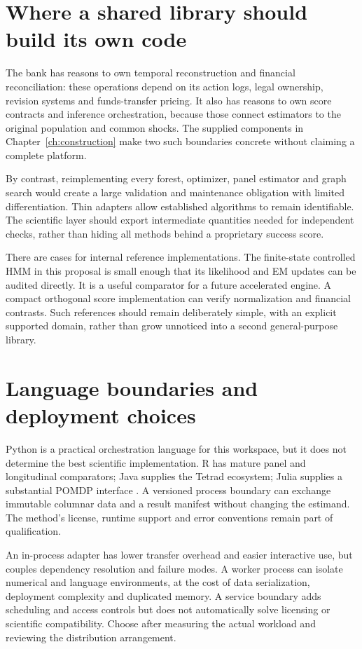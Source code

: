 \section{Where a shared library should build its own code}
The bank has reasons to own temporal reconstruction and financial
reconciliation: these operations depend on its action logs, legal ownership,
revision systems and funds-transfer pricing. It also has reasons to own
score contracts and inference orchestration, because those connect
estimators to the original population and common shocks. The supplied
components in Chapter~\ref{ch:construction} make two such boundaries
concrete without claiming a complete platform.

By contrast, reimplementing every forest, optimizer, panel estimator and
graph search would create a large validation and maintenance obligation
with limited differentiation. Thin adapters allow established algorithms
to remain identifiable. The scientific layer should export intermediate
quantities needed for independent checks, rather than hiding all methods
behind a proprietary success score.

There are cases for internal reference implementations. The finite-state
controlled HMM in this proposal is small enough that its likelihood and EM
updates can be audited directly. It is a useful comparator for a future
accelerated engine. A compact orthogonal score implementation can verify
normalization and financial contrasts. Such references should remain
deliberately simple, with an explicit supported domain, rather than grow
unnoticed into a second general-purpose library.

\section{Language boundaries and deployment choices}
Python is a practical orchestration language for this workspace, but it
does not determine the best scientific implementation. R has mature
panel and longitudinal comparators; Java supplies the Tetrad ecosystem;
Julia supplies a substantial POMDP interface \citep{sw_did,sw_ltmle,
sw_tetrad,sw_pomdps}. A versioned process boundary can exchange immutable
columnar data and a result manifest without changing the estimand.
The method's license, runtime support and error conventions remain part
of qualification.

An in-process adapter has lower transfer overhead and easier interactive
use, but couples dependency resolution and failure modes. A worker process
can isolate numerical and language environments, at the cost of data
serialization, deployment complexity and duplicated memory. A service
boundary adds scheduling and access controls but does not automatically
solve licensing or scientific compatibility. Choose after measuring the
actual workload and reviewing the distribution arrangement.

